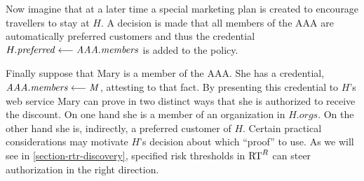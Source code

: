 Now imagine that at a later time a special marketing plan is created to
encourage travellers to stay at $H$. A decision is made that all
members of the AAA are automatically preferred customers and thus the
credential
$H.\mathit{preferred} \stackrel{}{\longleftarrow} \mathit{AAA}.\mathit{members}$ is added
to the policy.

Finally suppose that Mary is a member of the AAA. She has a
credential, $\mathit{AAA}.\mathit{members} \stackrel{}{\longleftarrow} \mathit{M}$,
attesting to that fact. By presenting this credential to $H$'s web
service Mary can prove in two distinct ways that she is authorized to
receive the discount. On one hand she is a member of an organization
in $H.\mathit{orgs}$. On the other hand she is, indirectly, a
preferred customer of $H$.  Certain practical considerations may
motivate $H$'s decision about which ``proof'' to use.  As we will see
in \autoref{section-rtr-discovery}, specified risk thresholds in
$\text{RT}^R$ can steer authorization in the right direction.
